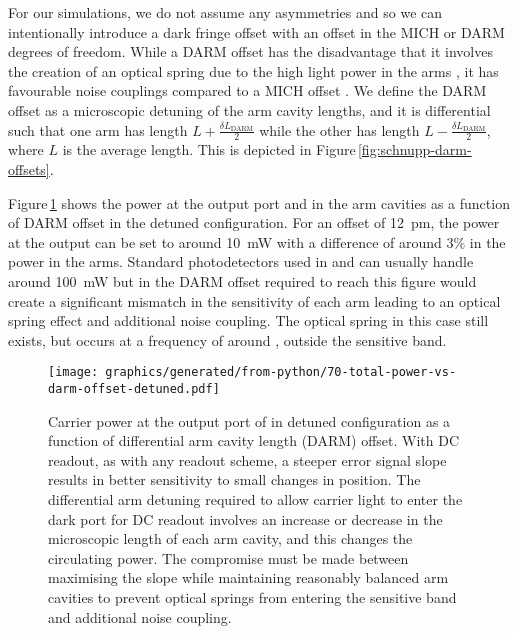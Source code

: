 For our simulations, we do not assume any asymmetries and so we can intentionally introduce a dark fringe offset with an offset in the \gls{MICH} or \gls{DARM} degrees of freedom. While a \gls{DARM} offset has the disadvantage that it involves the creation of an optical spring due to the high light power in the arms \cite{Heidmann2011}, it has favourable noise couplings compared to a \gls{MICH} offset \cite{Vajente2011}. We define the \gls{DARM} offset as a microscopic detuning of the arm cavity lengths, and it is differential such that one arm has length $L + \frac{\delta L_{\text{DARM}}}{2}$ while the other has length $L - \frac{\delta L_{\text{DARM}}}{2}$, where $L$ is the average length. This is depicted in Figure\,\ref{fig:schnupp-darm-offsets}.

Figure\,\ref{fig:total-power-vs-darm-offset-detuned} shows the power at the output port and in the arm cavities as a function of \gls{DARM} offset in the detuned configuration. For an offset of \SI{12}{\pico\meter}, the power at the output can be set to around \SI{10}{\milli\watt} with a difference of around 3\% in the power in the arms. Standard photodetectors used in \ALIGO{} and \AVIRGO{} can usually handle around \SI{100}{\milli\watt} but in \ETLF{} the \gls{DARM} offset required to reach this figure would create a significant mismatch in the sensitivity of each arm leading to an optical spring effect and additional noise coupling. The optical spring in this case still exists, but occurs at a frequency of around ,  outside the sensitive band.

\begin{figure}
  \centering
  \texttt{[image: graphics/generated/from-python/70-total-power-vs-darm-offset-detuned.pdf]}
  \caption[Carrier power at the output port of \ETLF{} in detuned configuration as a function of differential arm cavity offset]{\label{fig:total-power-vs-darm-offset-detuned}Carrier power at the output port of \ETLF{} in detuned configuration as a function of differential arm cavity length (\gls{DARM}) offset. With \gls{DC} readout, as with any readout scheme, a steeper error signal slope results in better sensitivity to small changes in position. The differential arm detuning required to allow carrier light to enter the dark port for \gls{DC} readout involves an increase or decrease in the microscopic length of each arm cavity, and this changes the circulating power. The compromise must be made between maximising the slope while maintaining reasonably balanced arm cavities to prevent optical springs from entering the sensitive band and additional noise coupling.}
\end{figure}

